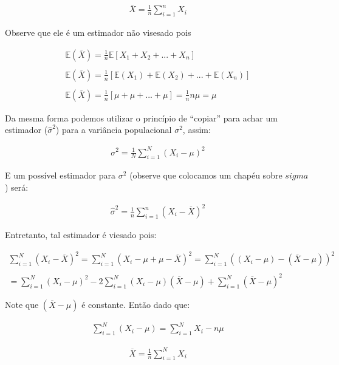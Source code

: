 \documentclass[
  letterpaper,
  DIV=11,
  numbers=noendperiod]{scrartcl}
\begin{document}
\[\begin{array}{ccc}
\bar{X} =\frac{1}{n}\sum_{i=1}^{n}X_i
\end{array}\]

Observe que ele é um estimador não visesado pois

\[\begin{array}{ccc}
\mathbb{E}(\bar{X})=\frac{1}{n}\mathbb{E}[X_1+X_2+...+X_n]
\\
\\
\mathbb{E}(\bar{X})=\frac{1}{n}[\mathbb{E}(X_1)+\mathbb{E}(X_2)+...+\mathbb{E}(X_n)]
\\
\\
\mathbb{E}(\bar{X})=\frac{1}{n}[\mu+\mu+...+\mu]=\frac{1}{n}n\mu=\mu
\end{array}\]

Da mesma forma podemos utilizar o princípio de ``copiar'' para achar um
estimador (\(\hat{\sigma}^2\)) para a variância populacional
\(\sigma^2\), assim:

\[\begin{array}{ccc}
\sigma^{2}=\frac{1}{N}\sum_{i=1}^{N}(X_i - \mu)^{2} 
\end{array}\]

E um possível estimador para \(\sigma^{2}\) (observe que colocamos um
chapéu sobre \(sigma\)) será:

\[\begin{array}{ccc}
\hat{\sigma}^{2}=\frac{1}{n}\sum_{i=1}^{n}(X_i - \overline{X})^{2} 
\end{array}\]

Entretanto, tal estimador é viesado pois:

\[\begin{array}{cc}
\sum_{i=1}^{N}(X_i - \overline{X})^{2} = \sum_{i=1}^{N}(X_i - \mu + \mu - \overline{X})^{2}=\sum_{i=1}^{N}((X_i - \mu)- (\overline{X}-\mu))^{2} 
\\ 
\\
= \sum_{i=1}^{N}(X_i - \mu)^{2}  - 2 \sum_{i=1}^{N}(X_i - \mu) (\overline{X} - \mu) + \sum_{i=1}^{N}(\overline{X}  - \mu)^{2} 
\end{array}\]

Note que \((\overline{X}  - \mu)\) é constante. Então dado que:

\[\begin{array}{c}
\sum_{i=1}^{N}(X_i - \mu)= \sum_{i=1}^{N}X_i - n\mu
\end{array}\]

\[\begin{array}{c}
\overline{X}=\frac{1}{n}\sum_{i=1}^{N}X_i 
\end{array}\]
\end{document}
